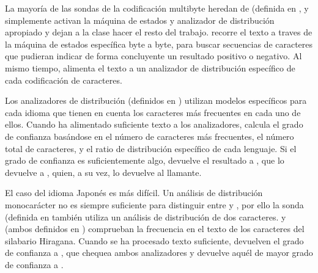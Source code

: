 La mayoría de las sondas de la codificación multibyte heredan de  (definida en , y simplemente activan la máquina de estados y analizador de distribución apropiado y dejan a la clase  hacer el resto del trabajo.  recorre el texto a traves de la máquina de estados específica byte a byte, para buscar secuencias de caracteres que pudieran indicar de forma concluyente un resultado positivo o negativo. Al mismo tiempo,  alimenta el texto a un analizador de distribución específico de cada codificación de caracteres.

Los analizadores de distribución (definidos en ) utilizan modelos específicos para cada idioma que tienen en cuenta los caracteres más frecuentes en cada uno de ellos. Cuando  ha alimentado suficiente texto a los analizadores, calcula el grado de confianza basándose en el número de caracteres más frecuentes, el número total de caracteres, y el ratio de distribución específico de cada lenguaje. Si el grado de confianza es suficientemente algo,  devuelve el resultado a , que lo devuelve a , quien, a su vez, lo devuelve al llamante.

El caso del idioma Japonés es más difícil. Un análisis de distribución monocarácter no es siempre suficiente para distinguir entre  y , por ello la sonda  (definida en  también utiliza un análisis de distribución de dos caracteres.  y  (ambos definidos en ) comprueban la frecuencia en el texto de los caracteres del silabario Hiragana. Cuando se ha procesado texto suficiente, devuelven el grado de confianza a , que chequea ambos analizadores y devuelve aquél de mayor grado de confianza a .

